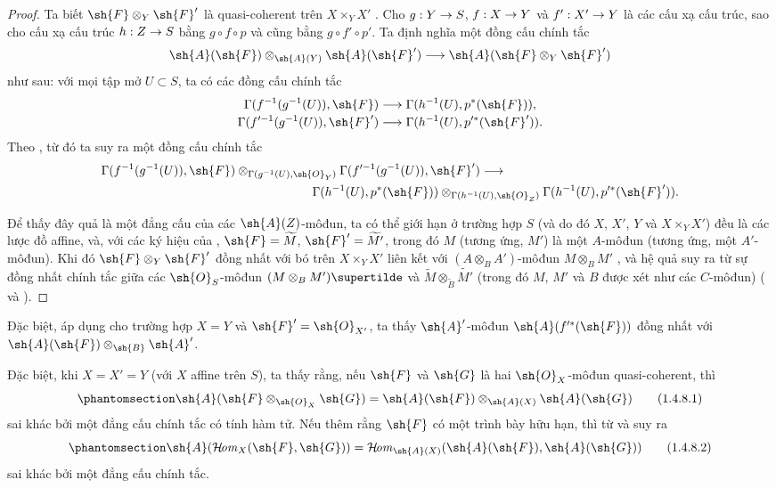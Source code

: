 \documentclass[oneside,10pt]{amsart}
\makeatletter
\newcommand{\ega@arrow}[2]{\mathchoice{#1}{#2}{#2}{#2}}
\renewcommand{\to}{\ega@arrow{\longrightarrow}{\rightarrow}}
\def\shHom{\mathcal{H}\!\mathit{om}}
\newcommand{\oldpage}[2][]{\marginnote{\normalfont\footnotesize\textbf{#1}~|~#2}\ignorespaces}
\let\EGAOriginalLabel\label
\renewcommand{\label}[1]{\phantomsection\EGAOriginalLabel{#1}}
\makeatother
\begin{document}
\begin{proof}
Ta biết $\sh{F}\otimes_Y\sh{F}'$ là quasi-coherent trên $X\times_Y X'$ .
Cho $g:Y\to S$, $f:X\to Y$ và $f':X'\to Y$ là các cấu xạ cấu trúc, sao cho cấu xạ cấu trúc
\oldpage[II]{11}
$h:Z\to S$ bằng $g\circ f\circ p$ và cũng bằng $g\circ f'\circ p'$.
Ta định nghĩa một đồng cấu chính tắc
\[
  \sh{A}(\sh{F})\otimes_{\sh{A}(Y)}\sh{A}(\sh{F}')
  \to
  \sh{A}(\sh{F}\otimes_Y\sh{F}')
\]
như sau: với mọi tập mở $U\subset S$, ta có các đồng cấu chính tắc
\[
  \begin{aligned}
  \Gamma(f^{-1}(g^{-1}(U)),\sh{F})
  &\longrightarrow\Gamma(h^{-1}(U),p^*(\sh{F})),
  \\[-2pt]
  \Gamma(f^{\prime-1}(g^{-1}(U)),\sh{F}')
  &\longrightarrow\Gamma(h^{-1}(U),p^{\prime*}(\sh{F}')).
  \end{aligned}
\]
Theo , từ đó ta suy ra một đồng cấu chính tắc
\[
  \begin{aligned}
  &\Gamma(f^{-1}(g^{-1}(U)),\sh{F})
    \otimes_{\Gamma(g^{-1}(U),\sh{O}_Y)}
    \Gamma(f^{\prime-1}(g^{-1}(U)),\sh{F}')\longrightarrow\\
  &\hspace{17em}
    \Gamma(h^{-1}(U),p^*(\sh{F}))
    \otimes_{\Gamma(h^{-1}(U),\sh{O}_Z)}
    \Gamma(h^{-1}(U),p^{\prime*}(\sh{F}')).
  \end{aligned}
\]

Để thấy đây quả là một đẳng cấu của các $\sh{A}(Z)$-môđun, ta có thể giới hạn ở trường hợp $S$ (và do đó $X$, $X'$, $Y$ và $X\times_Y X'$) đều là các lược đồ affine, và, với các ký hiệu của , $\sh{F}=\widetilde{M}$, $\sh{F}'=\widetilde{M'}$, trong đó $M$ (tương ứng, $M'$) là một $A$-môđun (tương ứng, một $A'$-môđun).
Khi đó $\sh{F}\otimes_Y\sh{F}'$ đồng nhất với bó trên $X\times_Y X'$ liên kết với $(A\otimes_B A')$-môđun $M\otimes_B M'$ , và hệ quả suy ra từ sự đồng nhất chính tắc giữa các $\sh{O}_S$-môđun $(M\otimes_B M')\supertilde$ và $\widetilde{M}\otimes_{\widetilde{B}}\widetilde{M'}$ (trong đó $M$, $M'$ và $B$ được xét như các $C$-môđun) ( và ).
\end{proof}

Đặc biệt, áp dụng  cho trường hợp $X=Y$ và $\sh{F}'=\sh{O}_{X'}$, ta thấy $\sh{A}'$-môđun $\sh{A}(f^{\prime*}(\sh{F}))$ đồng nhất với $\sh{A}(\sh{F})\otimes_\sh{B}\sh{A}'$.

\begin{env}[1.4.8]
\label{II.1.4.8}
Đặc biệt, khi $X=X'=Y$ (với $X$ affine trên $S$), ta thấy rằng, nếu $\sh{F}$ và $\sh{G}$ là hai $\sh{O}_X$-môđun quasi-coherent, thì
\[
\label{II.1.4.8.1}
  \sh{A}(\sh{F}\otimes_{\sh{O}_X}\sh{G})
  =\sh{A}(\sh{F})\otimes_{\sh{A}(X)}\sh{A}(\sh{G})
  \tag{1.4.8.1}
\]
sai khác bởi một đẳng cấu chính tắc có tính hàm tử.
Nếu thêm rằng $\sh{F}$ có một trình bày hữu hạn, thì từ  và  suy ra
\[
\label{II.1.4.8.2}
  \sh{A}(\shHom_X(\sh{F},\sh{G}))
  =\shHom_{\sh{A}(X)}(\sh{A}(\sh{F}),\sh{A}(\sh{G}))
  \tag{1.4.8.2}
\]
sai khác bởi một đẳng cấu chính tắc.
\end{env}
\end{document}
